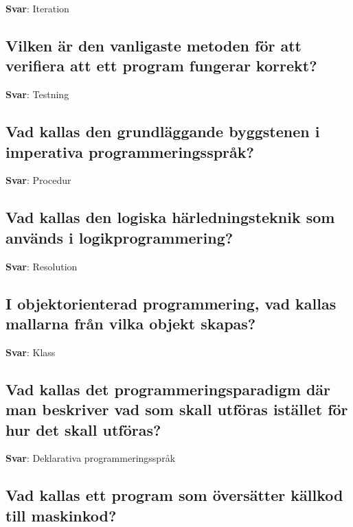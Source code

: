 \documentclass[a4paper,11pt,oneside]{article}
\begin{document}
\begin{sloppypar}
\label{q:32:sa:sv:True}

\textbf{Svar}: Iteration



\subsection{Vilken \"ar den vanligaste metoden f\"or att verifiera att ett program fungerar korrekt?}

\label{q:33:sa:sv:True}

\textbf{Svar}: Testning



\subsection{Vad kallas den grundl\"aggande byggstenen i imperativa programmeringsspr\r{a}k?}

\label{q:34:sa:sv:True}

\textbf{Svar}: Procedur



\subsection{Vad kallas den logiska h\"arledningsteknik som anv\"ands i logikprogrammering?}

\label{q:35:sa:sv:True}

\textbf{Svar}: Resolution



\subsection{I objektorienterad programmering, vad kallas mallarna fr\r{a}n vilka objekt skapas?}

\label{q:36:sa:sv:True}

\textbf{Svar}: Klass



\subsection{Vad kallas det programmeringsparadigm d\"ar man beskriver vad som skall utf\"oras ist\"allet f\"or hur det skall utf\"oras?}

\label{q:37:sa:sv:True}

\textbf{Svar}: Deklarativa programmeringsspr\r{a}k



\subsection{Vad kallas ett program som \"overs\"atter k\"allkod till maskinkod?}


\end{sloppypar}
\end{document}
